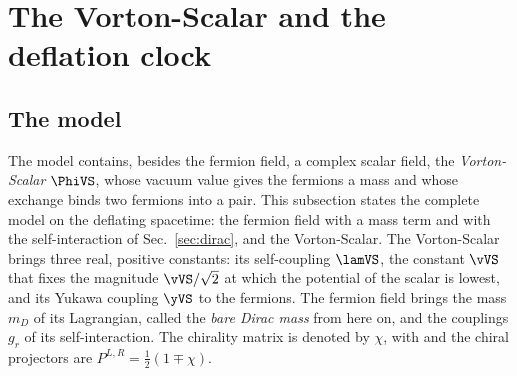 \section{The Vorton-Scalar and the deflation clock}
\label{sec:clock}

\subsection{The model}

The model contains, besides the fermion field, a complex scalar field, the \emph{Vorton-Scalar}
$\PhiVS$, whose vacuum value gives the fermions a mass and whose exchange binds two fermions into a
pair. This subsection states the complete model on the deflating spacetime: the fermion field with a
mass term and with the self-interaction of Sec.~\ref{sec:dirac}, and the Vorton-Scalar. The
Vorton-Scalar brings three real, positive constants: its self-coupling $\lamVS$, the constant
$\vVS$ that fixes the magnitude $\vVS/\sqrt2$ at which the potential of the scalar is lowest, and
its Yukawa coupling $\yVS$ to the fermions. The fermion field brings the mass $m_D$ of its
Lagrangian, called the \emph{bare Dirac mass} from here on, and the couplings $g_r$ of its
self-interaction. The chirality matrix is denoted by $\chi$, with
and the chiral projectors are $P^{L,R}=\tfrac12(1\mp\chi)$.

